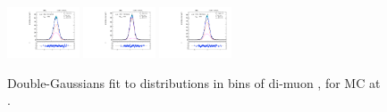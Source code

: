 \begin{figure}[htb]
\includegraphics[width=0.19\textwidth]{plots/Appendix_Recoil_Fits/ZmmMC_PF_13TeV_2G/pfu1fit_32.pdf}
\includegraphics[width=0.19\textwidth]{plots/Appendix_Recoil_Fits/ZmmMC_PF_13TeV_2G/pfu1fit_33.pdf}
\includegraphics[width=0.19\textwidth]{plots/Appendix_Recoil_Fits/ZmmMC_PF_13TeV_2G/pfu1fit_34.pdf}
\caption{Double-Gaussians fit to \upar distributions in bins of di-muon \pt, for \zmm MC at \serah.}
\label{fig:a:recoil:fit:mc:u1:13}
\end{figure}